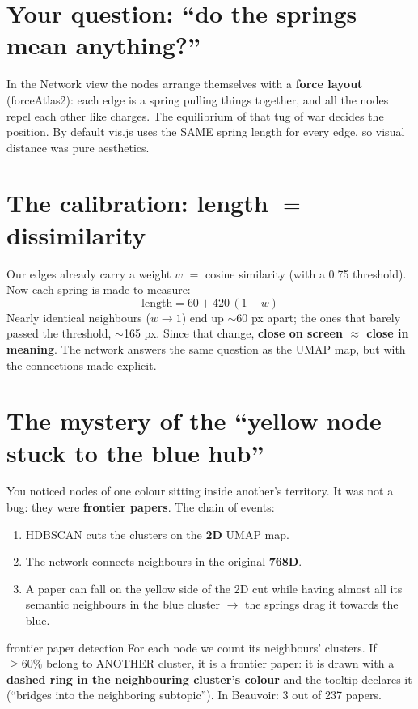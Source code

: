 \documentclass[11pt,a4paper]{article}
\begin{document}
\section{Your question: ``do the springs mean anything?''}

In the Network view the nodes arrange themselves with a \textbf{force layout} (forceAtlas2):
each edge is a spring pulling things together, and all the nodes repel each other like charges.
The equilibrium of that tug of war decides the position. By default vis.js uses the SAME spring
length for every edge, so visual distance was pure aesthetics.

\section{The calibration: length $=$ dissimilarity}

Our edges already carry a weight $w$ $=$ cosine similarity (with a 0.75 threshold). Now each
spring is made to measure:
\[
\mathrm{length} = 60 + 420\,(1 - w)
\]
Nearly identical neighbours ($w \to 1$) end up $\sim$60 px apart; the ones that barely passed
the threshold, $\sim$165 px. Since that change, \textbf{close on screen $\approx$ close in
meaning}. The network answers the same question as the UMAP map, but with the connections made
explicit.

\section{The mystery of the ``yellow node stuck to the blue hub''}

You noticed nodes of one colour sitting inside another's territory. It was not a bug: they were
\textbf{frontier papers}. The chain of events:

\begin{enumerate}
  \item HDBSCAN cuts the clusters on the \textbf{2D} UMAP map.
  \item The network connects neighbours in the original \textbf{768D}.
  \item A paper can fall on the yellow side of the 2D cut while having almost all its semantic
        neighbours in the blue cluster $\rightarrow$ the springs drag it towards the blue.
\end{enumerate}

\begin{concepto}{frontier paper detection}
For each node we count its neighbours' clusters. If $\geq 60\%$ belong to ANOTHER cluster, it
is a frontier paper: it is drawn with a \textbf{dashed ring in the neighbouring cluster's
colour} and the tooltip declares it (``bridges into the neighboring subtopic''). In Beauvoir:
3 out of 237 papers.
\end{concepto}
\end{document}
